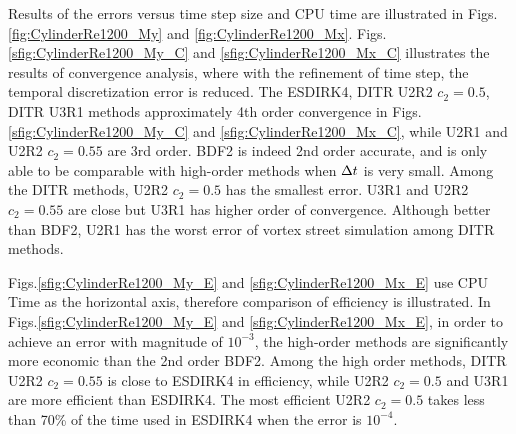 Results of the errors versus time step size and CPU time
are illustrated in
Figs.\ref{fig:CylinderRe1200_My} and \ref{fig:CylinderRe1200_Mx}.
Figs.\ref{sfig:CylinderRe1200_My_C} and \ref{sfig:CylinderRe1200_Mx_C}
illustrates the results of convergence analysis, where
with the refinement of time step, the temporal
discretization error is reduced.
The ESDIRK4, DITR U2R2 $c_2=0.5$, DITR U3R1 methods
approximately 4th order convergence in
Figs.\ref{sfig:CylinderRe1200_My_C} and \ref{sfig:CylinderRe1200_Mx_C},
while U2R1 and U2R2 $c_2=0.55$ are 3rd order.
BDF2 is indeed 2nd order accurate, and is only able
to be comparable with high-order methods when ${\Delta} t$
is very small.
Among the DITR methods, U2R2 $c_2=0.5$ has the smallest error.
U3R1 and U2R2 $c_2=0.55$ are close but U3R1 has higher order of convergence.
Although better than BDF2,
U2R1 has the worst error of vortex street simulation among DITR methods.

Figs.\ref{sfig:CylinderRe1200_My_E} and \ref{sfig:CylinderRe1200_Mx_E}
use CPU Time as the horizontal axis, therefore comparison of efficiency is illustrated.
In Figs.\ref{sfig:CylinderRe1200_My_E} and \ref{sfig:CylinderRe1200_Mx_E},
in order to achieve an error with magnitude of $10^{-3}$, the
high-order methods are significantly more economic than the
2nd order BDF2.
Among the high order methods, DITR U2R2 $c_2=0.55$ is
close to ESDIRK4 in efficiency, while
U2R2 $c_2=0.5$ and U3R1 are more efficient than ESDIRK4.
The most efficient U2R2 $c_2=0.5$ takes less than 70\% of
the time used in ESDIRK4 when the error is $10^{-4}$.




